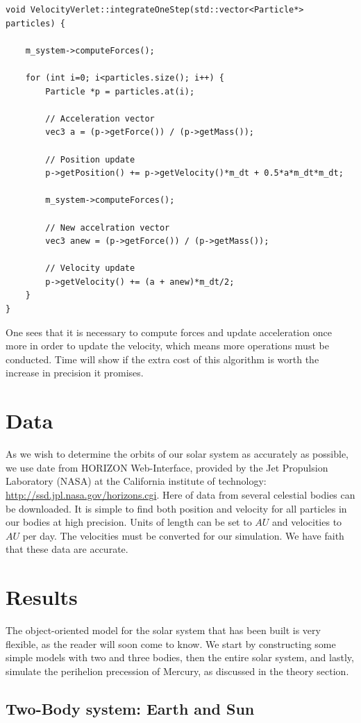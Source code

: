 \documentclass[10pt,a4paper]{amsart}
\begin{document}
\begin{lstlisting}
void VelocityVerlet::integrateOneStep(std::vector<Particle*> particles) {
    
	m_system->computeForces();
    
	for (int i=0; i<particles.size(); i++) {
		Particle *p = particles.at(i);

		// Acceleration vector
		vec3 a = (p->getForce()) / (p->getMass());

		// Position update
		p->getPosition() += p->getVelocity()*m_dt + 0.5*a*m_dt*m_dt;

		m_system->computeForces();

		// New accelration vector
		vec3 anew = (p->getForce()) / (p->getMass());

		// Velocity update
		p->getVelocity() += (a + anew)*m_dt/2;
	}
}
\end{lstlisting}
One sees that it is necessary to compute forces and update acceleration once more in order to update the velocity, which means more operations must be conducted. Time will show if the extra cost of this algorithm is worth the  increase in precision it promises.

\section{Data}
As we wish to determine the orbits of our solar system as accurately as possible, we use date from HORIZON Web-Interface, provided by the Jet Propulsion Laboratory (NASA) at the California institute of technology: \url{http://ssd.jpl.nasa.gov/horizons.cgi}. Here of data from several celestial bodies can be downloaded. It is simple to find both position and velocity for all particles in our bodies at high precision. Units of length can be set to $AU$ and velocities to $AU$ per day. The velocities must be converted for our simulation. We have faith that these data are accurate.

\section{Results}

The object-oriented model for the solar system that has been built is very flexible, as the reader will soon come to know. We start by constructing some simple models with two and three bodies, then the entire solar system, and lastly, simulate the perihelion precession of Mercury, as discussed in the theory section.

\subsection{Two-Body system: Earth and Sun}
\end{document}
